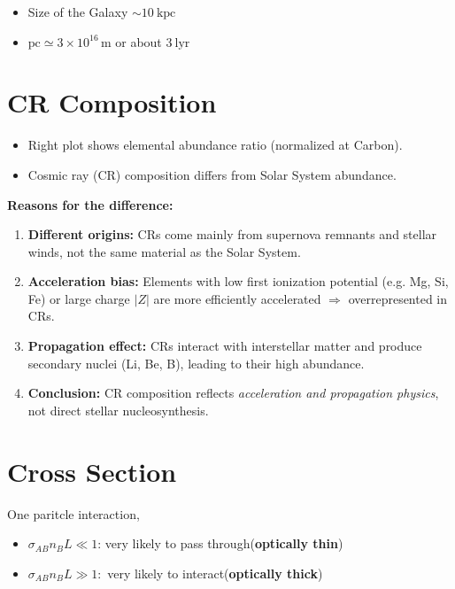 \documentclass{sciposter}
\begin{document}
\begin{multicols}{3}
\begin{itemize}
    \item Size of the Galaxy $\sim 10~\text{kpc}$

    \item $\text{pc} \simeq 3\times10^{16}\,\text{m}$ \quad or about $3~\text{lyr}$
\end{itemize}

\section{CR Composition}

\begin{itemize}
    \item Right plot shows elemental abundance ratio (normalized at Carbon).
    \item Cosmic ray (CR) composition differs from Solar System abundance.
\end{itemize}

\textbf{Reasons for the difference:}

\begin{enumerate}
    \item \textbf{Different origins:}  
    CRs come mainly from supernova remnants and stellar winds, not the same material as the Solar System.

    \item \textbf{Acceleration bias:}  
    Elements with low first ionization potential (e.g. Mg, Si, Fe) or large charge $|Z|$ are more efficiently accelerated $\Rightarrow$ overrepresented in CRs.

    \item \textbf{Propagation effect:}  
    CRs interact with interstellar matter and produce secondary nuclei (Li, Be, B), leading to their high abundance.

    \item \textbf{Conclusion:}  
    CR composition reflects \textit{acceleration and propagation physics}, not direct stellar nucleosynthesis.
\end{enumerate}


\section{Cross Section}
One paritcle interaction, 
\begin{itemize}
  \item $\sigma_{AB}n_{B}L \ll 1  $: very likely to pass through(\textbf{optically thin})
  \item $\sigma_{AB}n_{B}L \gg 1:  $ very likely to interact(\textbf{optically thick})
\end{itemize}


\end{multicols}
\end{document}
